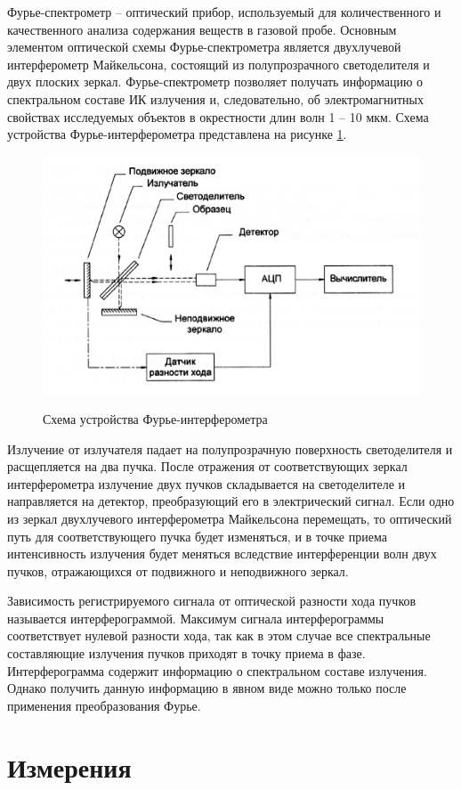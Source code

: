 \documentclass[a4paper,12pt]{article} %
\begin{document}
    Фурье-спектрометр -- оптический прибор, используемый для количественного и качественного анализа содержания веществ в газовой пробе. 
    Основным элементом оптической схемы Фурье-спектрометра является двухлучевой интерферометр Майкельсона, 
    состоящий из полупрозрачного светоделителя и двух плоских зеркал. 
    Фурье-спектрометр позволяет получать информацию о спектральном составе ИК излучения и, следовательно, 
    об электромагнитных свойствах исследуемых объектов в окрестности длин волн 1 -- 10 мкм. 
    Схема устройства Фурье-интерферометра представлена на рисунке \hyperref[picture_1]{1}.

    \begin{figure}[h!]
        \centering
        \includegraphics[width=0.48\linewidth]{1.png}
        \label{picture_1}
        \caption{Схема устройства Фурье-интерферометра}
    \end{figure}

    Излучение от излучателя падает на полупрозрачную поверхность светоделителя и расщепляется на два пучка. 
    После отражения от соответствующих зеркал интерферометра излучение двух пучков складывается на светоделителе и направляется на детектор, 
    преобразующий его в электрический сигнал. Если одно из зеркал двухлучевого интерферометра Майкельсона перемещать, 
    то оптический путь для соответствующего пучка будет изменяться, 
    и в точке приема интенсивность излучения будет меняться вследствие интерференции волн двух пучков, 
    отражающихся от подвижного и неподвижного зеркал.

    Зависимость регистрируемого сигнала от оптической разности хода пучков называется интерферограммой. 
    Максимум сигнала интерферограммы соответствует нулевой разности хода, 
    так как в этом случае все спектральные составляющие излучения пучков приходят в точку приема в фазе. 
    Интерферограмма содержит информацию о спектральном составе излучения. 
    Однако получить данную информацию в явном виде можно только после применения преобразования Фурье.

    \newpage

    \section{Измерения}
\end{document}
